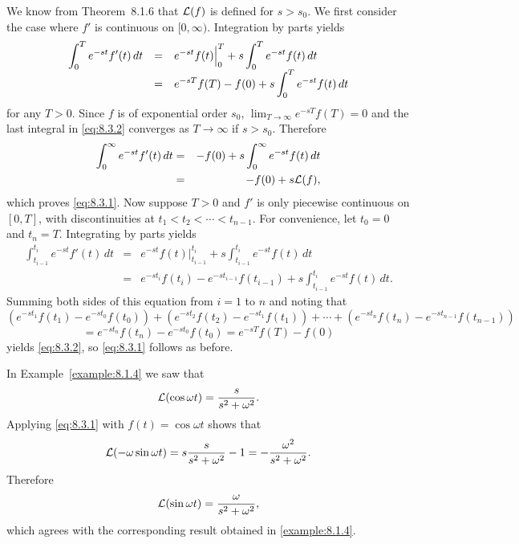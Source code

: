 We know from Theorem~8.1.6 that ${\cal L}(f)$ is defined for $s>s_{0}$. We first consider the case
where $f'$ is continuous on $[0,\infty)$. Integration by parts yields
\begin{equation}
  \label{eq:8.3.2}
  \begin{array}{ccl}
    \displaystyle\int^{T}_{0}e^{-st}f'(t)\,dt & = & \displaystyle e^{-st}f(t)\Big|^{T}_{0}+s \displaystyle\int^{T}_{0}e^{-st}f(t)\,dt \\
                                     & = & \displaystyle e^{-sT}f(T)-f(0)+s\int^{T}_{0}e^{-st}f(t)\,dt
  \end{array}
\end{equation}
for any $T>0$. Since $f$ is of exponential order $s_{0}$, $\lim_{T\to\infty}e^{-sT}f(T)=0$ and the
last integral in \eqref{eq:8.3.2} converges as $T\to\infty$ if $s>s_{0}$. Therefore
\begin{eqnarray*}
  \int^{\infty}_{0}e^{-st}f'(t)\,dt & = & -f(0)+s\int^{\infty}_{0}e^{-st}f(t)\,dt \\
                                    & = & -f(0)+s{\cal L}(f),
\end{eqnarray*}
which proves \eqref{eq:8.3.1}. Now suppose $T>0$ and $f'$ is only piecewise continuous on $[0,T]$,
with discontinuities at $t_{1}<t_{2}<\cdots<t_{n-1}$. For convenience, let $t_{0}=0$ and $t_{n}=T$.
Integrating by parts yields
\begin{eqnarray*}
  \int^{t_{i}}_{t_{i-1}}e^{-st}f'(t)\,dt & = & e^{-st}f(t)\Big|^{t_{i}}_{t_{i-1}}+s\int^{t_{i}}_{t_{i-1}}e^{-st}f(t)\,dt \\
                                         & = & e^{-st_{i}}f(t_{i})-e^{-st_{i-1}}f(t_{i-1})+s\int^{t_{i}}_{t_{i-1}}e^{-st}f(t)\,dt.
\end{eqnarray*}
Summing both sides of this equation from $i=1$ to $n$ and noting that
\[
  \left(e^{-st_{1}}f(t_{1})-e^{-st_{0}}f(t_{0})\right)+\left(e^{-st_{2}}f(t_{2})-e^{-st_{1}}f(t_{1})\right) +\cdots+\left(e^{-st_{n}}f(t_{n})-e^{-st_{n-1}}f(t_{n-1})\right)
\]
\[
  =e^{-st_{n}}f(t_{n})-e^{-st_{0}}f(t_{0})=e^{-sT}f(T)-f(0)
\]
yields \eqref{eq:8.3.2}, so \eqref{eq:8.3.1} follows as before.

\begin{example}
  \label{example:8.3.1}\rm In Example~\ref{example:8.1.4} we saw that
  \[
    {\cal L}(\cos\omega t)=\frac{s}{s^{2}+\omega^{2}}.
  \]
  Applying \eqref{eq:8.3.1} with $f(t)=\cos\omega t$ shows that
  \[
    {\cal L}(-\omega\sin\omega t)=s\frac{s}{s^{2}+\omega^{2}}-1=- \frac{\omega^{2}}{s^{2}+\omega^{2}}.
  \]
  Therefore
  \[
    {\cal L}(\sin\omega t)=\frac{\omega}{s^{2}+\omega^{2}},
  \]
  which agrees with the corresponding result obtained in \ref{example:8.1.4}. \bbox
\end{example}


